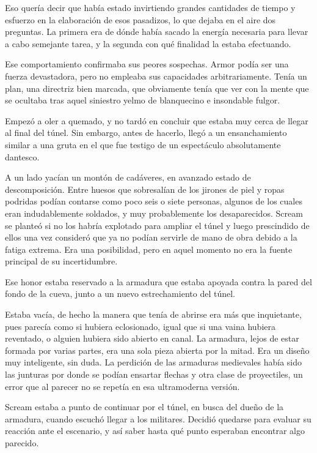 Eso quería decir que había estado invirtiendo grandes cantidades de tiempo y esfuerzo en la elaboración de esos pasadizos, lo que dejaba en el aire dos preguntas. La primera era de dónde había sacado la energía necesaria para llevar a cabo semejante tarea, y la segunda con qué finalidad la estaba efectuando.

Ese comportamiento confirmaba sus peores sospechas. Armor podía ser una fuerza devastadora, pero no empleaba sus capacidades arbitrariamente. Tenía un plan, una directriz bien marcada, que obviamente tenía que ver con la mente que se ocultaba tras aquel siniestro yelmo de blanquecino e insondable fulgor.

Empezó a oler a quemado, y no tardó en concluir que estaba muy cerca de llegar al final del túnel. Sin embargo, antes de hacerlo, llegó a un ensanchamiento similar a una gruta en el que fue testigo de un espectáculo absolutamente dantesco.

A un lado yacían un montón de cadáveres, en avanzado estado de descomposición. Entre huesos que sobresalían de los jirones de piel y ropas podridas podían contarse como poco seis o siete personas, algunos de los cuales eran indudablemente soldados, y muy probablemente los desaparecidos. Scream se planteó si no los habría explotado para ampliar el túnel y luego prescindido de ellos una vez consideró que ya no podían servirle de mano de obra debido a la fatiga extrema. Era una posibilidad, pero en aquel momento no era la fuente principal de su incertidumbre.

Ese honor estaba reservado a la armadura que estaba apoyada contra la pared del fondo de la cueva, junto a un nuevo estrechamiento del túnel.

Estaba vacía, de hecho la manera que tenía de abrirse era más que inquietante, pues parecía como si hubiera eclosionado, igual que si una vaina hubiera reventado, o alguien hubiera sido abierto en canal. La armadura, lejos de estar formada por varias partes, era una sola pieza abierta por la mitad. Era un diseño muy inteligente, sin duda. La perdición de las armaduras medievales había sido las junturas por donde se podían ensartar flechas y otra clase de proyectiles, un error que al parecer no se repetía en esa ultramoderna versión.

Scream estaba a punto de continuar por el túnel, en busca del dueño de la armadura, cuando escuchó llegar a los militares. Decidió quedarse para evaluar su reacción ante el escenario, y así saber hasta qué punto esperaban encontrar algo parecido.

